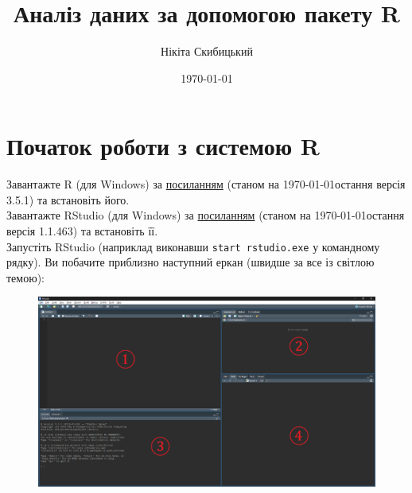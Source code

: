 \documentclass[a4paper, 12pt]{article}
\title{Аналіз даних за допомогою пакету R}
\author{Нікіта Скибицький}
\date{\today}
\begin{document}
\maketitle

\thispagestyle{empty}

\newpage

\section{Початок роботи з системою R}

Завантажте R (для Windows) за \href{https://cloud.r-project.org/bin/windows/base/}{посиланням} (станом на \today остання версія 3.5.1) та встановіть його. \\

Завантажте RStudio (для Windows) за \href{https://download1.rstudio.org/RStudio-1.1.463.exe}{посиланням} (станом на \today остання версія 1.1.463) та встановіть її. \\

Запустіть RStudio (наприклад виконавши \verb|start rstudio.exe| у командному рядку). Ви побачите приблизно наступний еркан (швидше за все із світлою темою):
\begin{figure}[H]
	\centering
	\includegraphics[width=\linewidth]{rstudio-workplace-1-2-3-4.png}
\end{figure}
\end{document}
